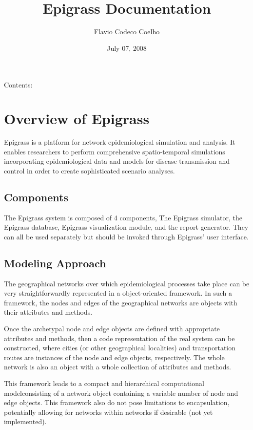 \documentclass[a4paper,10pt]{manual}
\title{Epigrass Documentation}
\date{July 07, 2008}
\author{Flavio Codeco Coelho}
\begin{document}
\maketitle
\tableofcontents



Contents:

\resetcurrentobjects


\chapter{Overview of Epigrass}

Epigrass is a platform for network epidemiological simulation and analysis. It enables researchers to perform comprehensive spatio-temporal simulations incorporating epidemiological data and models for disease transmission and control in order to create sophisticated scenario analyses.


\section{Components}

The Epigrass system is composed of 4 components, The Epigrass simulator, the Epigrass database, Epigrass visualization module, and the report generator. They can all be used separately but should be invoked through Epigrass' user interface.


\section{Modeling Approach}

The geographical networks  over which epidemiological processes take place can be very straightforwardly represented in a object-oriented framework. In such a framework, the nodes and edges of the geographical networks are objects with their attributes and methods.

Once the archetypal node and edge objects are defined with appropriate attributes and methods, then a code representation of the real system can be constructed, where cities (or other geographical localities) and transportation routes are instances of the node and edge objects, respectively. The whole network is also an object with a whole collection of attributes and methods.

This framework leads to a compact and hierarchical computational modelconsisting of a network object containing a variable number of node and edge objects. This framework also do not pose limitations to encapsulation, potentially allowing for networks within networks if desirable (not yet implemented).
\end{document}

